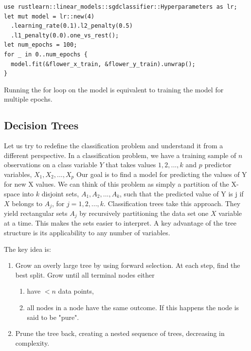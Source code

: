 \documentclass{book}
\begin{document}
\begin{lstlisting}[caption={chapter3\\/rustlearn\_classification\_tasks\\/src\\/logistic\_reg\\.rs}]
use rustlearn::linear_models::sgdclassifier::Hyperparameters as lr;
let mut model = lr::new(4)
  .learning_rate(0.1).l2_penalty(0.5)
  .l1_penalty(0.0).one_vs_rest();
let num_epochs = 100;
for _ in 0..num_epochs {
  model.fit(&flower_x_train, &flower_y_train).unwrap();
}
\end{lstlisting}
Running the for loop on the model is equivalent to training the model for multiple epochs.
\label{par:model_training}

\label{sub:logistic_regression}

\subsection{Decision Trees}%
Let us try to redefine the classification problem and understand it from a different perspective. In a classification problem, we have a training sample of $n$ observations on a class variable $Y$ that takes values $1, 2, ..., k$ and $p$ predictor variables, $X_1, X_2, ..., X_p$ Our goal is to find a model for predicting the values of Y for new X values. We can think of this problem as simply a partition of the X-space into $k$ disjoint sets, $A_1, A_2, ..., A_k$, such that the predicted value of Y is j if $X$ belongs to $A_j$, for $j = 1, 2, ..., k$. Classification trees take this approach. They yield rectangular sets $A_j$ by recursively partitioning the data set one $X$ variable at a time. This makes the sets easier to interpret. A key advantage of the tree structure is its applicability to any number of variables. 

The key idea is:

\begin{enumerate}
	\item Grow an overly large tree by using forward selection. At each step, find the best split. Grow until all terminal nodes either
		\begin{enumerate}
			\item have $< n$ data points,
			\item all nodes in a node have the same outcome. If this happens the node is said to be "pure".
		\end{enumerate}
	\item Prune the tree back, creating a nested sequence of trees, decreasing in complexity.
\end{enumerate}
\end{document}
